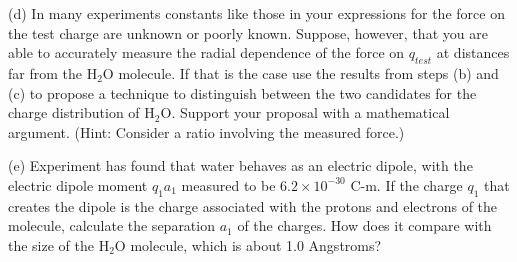(d) In many experiments constants like those in your expressions for
the force on the test charge are unknown or poorly known. Suppose,
however, that you are able to accurately measure the radial dependence
of the force on $q_{test}$ at distances far from the  H$_2$O
molecule. If that is the case use the results from steps (b) and (c)
to propose a technique to distinguish between the two candidates for
the charge distribution of  H$_2$O. Support your proposal with
a mathematical argument. (Hint: Consider a ratio involving the measured
force.)
\answerspace{25mm}

(e) Experiment has found that water behaves as an electric dipole,
with the electric dipole moment $q_1 a_1$ measured
to be $6.2 \times 10^{-30}$ C-m. If the charge $q_1$ that creates the dipole
is the charge associated with the protons and electrons
of the molecule, calculate the separation $a_1$ of the charges.
How does it compare with the size of the  H$_2$O molecule, which is
about 1.0 Angstroms?
\answerspace{15mm}

